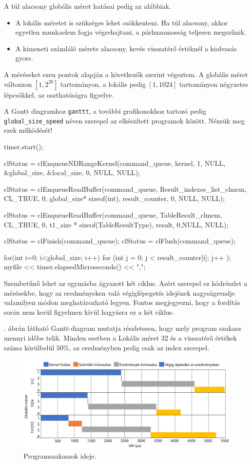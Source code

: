 A túl alacsony globális méret hatásai pedig az alábbiak.
\begin{itemize}
\item A lokális méretet is szükséges lehet csökkenteni. Ha túl alacsony, akkor egyetlen munkaelem fogja végrehajtani, a párhuzamosság teljesen megszűnik.
\item A kimeneti számláló mérete alacsony, kevés visszatérő értéknél a kiolvasás gyors.
\end{itemize}
A méréseket ezen pontok alapján a következők szerint végeztem.
A globális méret változzon $[1, 2^{20}]$ tartományon, a lokális pedig $[1, 1024]$ tartományon négyzetes lépcsőkkel, az oszthatóságra figyelve.

A Gantt diagramhoz \texttt{ganttt}, a további grafikonokhoz tartozó pedig \\
\texttt{global\_size\_speed} néven szerepel az elkészített programok között. Nézzük meg ezek működését!
\begin{python}  
timer.start();

clStatus = clEnqueueNDRangeKernel(command_queue, kernel, 1, NULL, 
	&global_size, &local_size, 0, NULL, NULL);

clStatus =
	clEnqueueReadBuffer(command_queue, Result_indexes_list_clmem, 
	CL_TRUE, 0, global_size* sizeof(int), 
	result_counter, 0, NULL, NULL);
	
clStatus = clEnqueueReadBuffer(command_queue, TableResult_clmem, 
	CL_TRUE, 0, t1_size * sizeof(TableResultType), 
	result, 0,NULL, NULL);

clStatus = clFinish(command_queue);
clStatus = clFlush(command_queue);

for(int i=0; i<global_size; i++)
{
    for (int j = 0; j < result_counter[i]; j++ );
}
myfile << timer.elapsedMicroseconds() << ",";  
\end{python}

Szembetűnő lehet az egymásba ágyazott két ciklus. Azért szerepel ez kódrészlet a mérésekbe, hogy az eredményeken való végiglépegetés idejének nagyságrendje valamilyen módon meghatározható legyen. Fontos megjegyezni, hogy a fordítás során nem kerül figyelmen kívül hagyásra ez a két ciklus.

. ábrán látható Gantt-diagram mutatja részletesen, hogy mely program szakasz mennyi időbe telik.
Minden esetben a Lokális méret 32 és a visszatérő értékek száma körülbelül $50\%$, az eredményben pedig csak az index szerepel.

\begin{figure}[h!]
\centering
\includegraphics[width=\textwidth]{images/gantt.png}
\caption{Programszakaszok ideje.}
\label{fig:gantt}
\end{figure}

